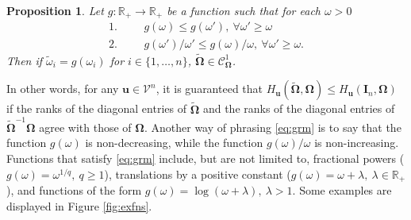\documentclass[12pt]{article}
\newtheorem{proposition}{Proposition}
\newcommand{\bl}[1]{{\mathbf #1}}
\newcommand{\bs}[1]{\boldsymbol #1}
\begin{document}
\begin{proposition}\label{prop:mono}
    Let $g : \mathbb{R}_+ \rightarrow \mathbb{R}_{+}$ be a function such that for each $\omega > 0$
    \begin{equation}\label{eq:grm}\tag{GRM}
        \begin{aligned} 
            1. && &g(\omega) \leq g(\omega'),~\forall \omega' \geq \omega \\
            2. && &g(\omega') / \omega' \leq  g(\omega) / \omega,~\forall \omega' \geq \omega.
        \end{aligned}
    \end{equation}
     Then if $\tilde{\omega}_i = g(\omega_i)$ for $i \in \{1, \dots, n\}$, $\tilde{\bs{\Omega}} \in \mathcal{C}^1_{\bs{\Omega}}$.
\end{proposition}
In other words, for any $\bl{u} \in \mathcal{V}^n$, it is guaranteed that $H_{\bl{u}}(\tilde{\bs{\Omega}}, \bs{\Omega}) \leq H_{\bl{u}}(\bl{I}_n, \bs{\Omega})$ if the ranks of the diagonal entries of $\tilde{\bs{\Omega}}$ and the ranks of the diagonal entries of $\tilde{\bs{\Omega}}^{-1} \bs{\Omega}$ agree with those of $\bs{\Omega}$. Another way of phrasing \eqref{eq:grm} is to say that the function $g(\omega)$ is non-decreasing, while the function $g(\omega)/\omega$ is non-increasing. Functions that satisfy \eqref{eq:grm} include, but are not limited to, fractional powers ($g(\omega) = \omega^{1/q},~q \geq 1$), translations by a positive constant ($g(\omega) = \omega + \lambda,~\lambda \in \mathbb{R}_+$), and functions of the form $g(\omega) = \log(\omega + \lambda),~\lambda > 1$. Some examples are displayed in Figure \ref{fig:exfns}. 
\end{document}
